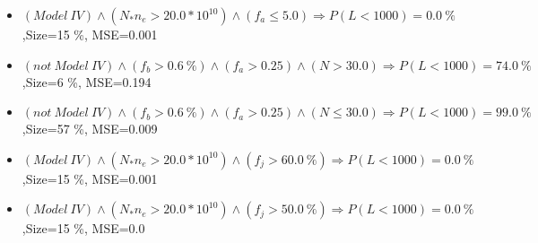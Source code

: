 \documentclass[numbered]{CSL}
\begin{document}
\begin{itemize}
\item $(Model~IV) \land (N_* n_e > 20.0 * 10^{10}) \land (f_a \leq 5.0) \Rightarrow P(L < 1 000) = 0.0~\%$,\hfill Size=15 \%, MSE=0.001
\item $(not~Model~IV) \land (f_b > 0.6~\%) \land (f_a > 0.25) \land (N > 30.0) \Rightarrow P(L < 1 000) = 74.0~\%$,\hfill Size=6 \%, MSE=0.194
\item $(not~Model~IV) \land (f_b > 0.6~\%) \land (f_a > 0.25) \land (N \leq 30.0) \Rightarrow P(L < 1 000) = 99.0~\%$,\hfill Size=57 \%, MSE=0.009
\item $(Model~IV) \land (N_* n_e > 20.0 * 10^{10}) \land (f_j > 60.0~\%) \Rightarrow P(L < 1 000) = 0.0~\%$,\hfill Size=15 \%, MSE=0.001
\item $(Model~IV) \land (N_* n_e > 20.0 * 10^{10}) \land (f_j > 50.0~\%) \Rightarrow P(L < 1 000) = 0.0~\%$,\hfill Size=15 \%, MSE=0.0
\end{itemize}
\end{document}
